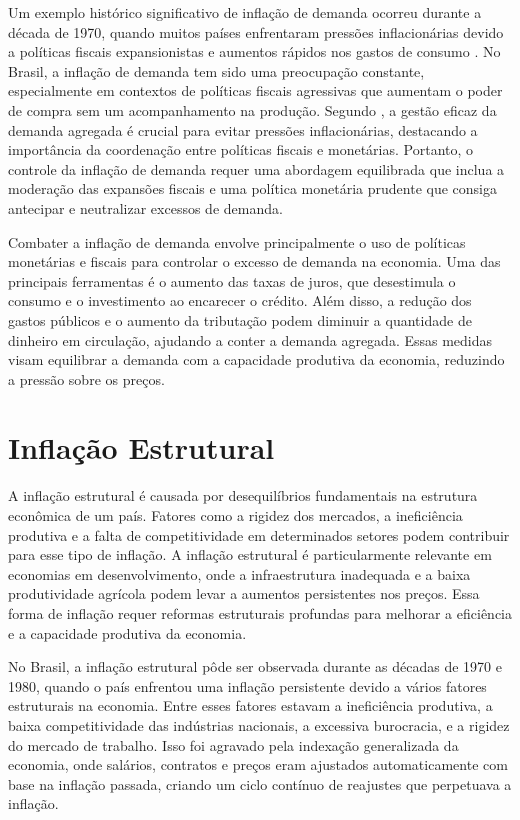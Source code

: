 \documentclass[12pt,oneside,a4paper,chapter=TITLE,english,brazil,sumario=abnt-6027-2012]{abntex2}
\begin{document}
Um exemplo histórico significativo de inflação de demanda ocorreu durante a década de 1970, quando muitos países enfrentaram pressões inflacionárias devido a políticas fiscais expansionistas e aumentos rápidos nos gastos de consumo \cite{blinder_2008_the}. No Brasil, a inflação de demanda tem sido uma preocupação constante, especialmente em contextos de políticas fiscais agressivas que aumentam o poder de compra sem um acompanhamento na produção. Segundo \cite{woodford_2009_interest}, a gestão eficaz da demanda agregada é crucial para evitar pressões inflacionárias, destacando a importância da coordenação entre políticas fiscais e monetárias. Portanto, o controle da inflação de demanda requer uma abordagem equilibrada que inclua a moderação das expansões fiscais e uma política monetária prudente que consiga antecipar e neutralizar excessos de demanda.

Combater a inflação de demanda envolve principalmente o uso de políticas monetárias e fiscais para controlar o excesso de demanda na economia. Uma das principais ferramentas é o aumento das taxas de juros, que desestimula o consumo e o investimento ao encarecer o crédito. Além disso, a redução dos gastos públicos e o aumento da tributação podem diminuir a quantidade de dinheiro em circulação, ajudando a conter a demanda agregada. Essas medidas visam equilibrar a demanda com a capacidade produtiva da economia, reduzindo a pressão sobre os preços.

\section{Inflação Estrutural}

A inflação estrutural é causada por desequilíbrios fundamentais na estrutura econômica de um país. Fatores como a rigidez dos mercados, a ineficiência produtiva e a falta de competitividade em determinados setores podem contribuir para esse tipo de inflação. A inflação estrutural é particularmente relevante em economias em desenvolvimento, onde a infraestrutura inadequada e a baixa produtividade agrícola podem levar a aumentos persistentes nos preços. Essa forma de inflação requer reformas estruturais profundas para melhorar a eficiência e a capacidade produtiva da economia.

No Brasil, a inflação estrutural pôde ser observada durante as décadas de 1970 e 1980, quando o país enfrentou uma inflação persistente devido a vários fatores estruturais na economia. Entre esses fatores estavam a ineficiência produtiva, a baixa competitividade das indústrias nacionais, a excessiva burocracia, e a rigidez do mercado de trabalho. Isso foi agravado pela indexação generalizada da economia, onde salários, contratos e preços eram ajustados automaticamente com base na inflação passada, criando um ciclo contínuo de reajustes que perpetuava a inflação.
\end{document}
